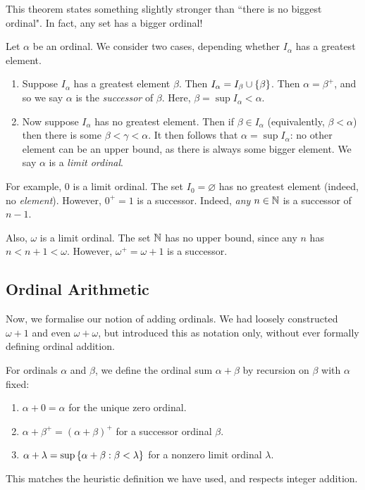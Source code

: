\documentclass{article}
\begin{document}
\begin{note}
	This theorem states something slightly stronger than ``there is no biggest ordinal". In fact, any set has a bigger ordinal!
\end{note}

\begin{definition}
    Let $\alpha$ be an ordinal. We consider two cases, depending whether $I_\alpha$ has a greatest element.
	\begin{enumerate}
	    \item Suppose $I_\alpha$ has a greatest element $\beta$. Then $I_\alpha = I_\beta \cup \left\lbrace \beta \right\rbrace$. Then $\alpha = \beta^+$, and so we say $\alpha$ is the \textit{successor} of $\beta$. Here, $\beta = \sup I_\alpha < \alpha$.
	    \item Now suppose $I_\alpha$ has no greatest element. Then if $\beta \in I_\alpha$ (equivalently, $\beta < \alpha$) then there is some $\beta < \gamma < \alpha$. It then follows that $\alpha = \sup I_\alpha$: no other element can be an upper bound, as there is always some bigger element. We say $\alpha$ is a \textit{limit ordinal}.
	\end{enumerate}
	For example, 0 is a limit ordinal. The set $I_0 = \varnothing$ has no greatest element (indeed, no \textit{element}). However, $0^+ = 1$ is a successor. Indeed, \textit{any} $n \in \mathbb{N}$ is a successor of $n-1$.
	
	Also, $\omega$ is a limit ordinal. The set $\mathbb{N}$ has no upper bound, since any $n$ has $n < n+1 < \omega$. However, $\omega^+ = \omega + 1$ is a successor.
\end{definition}


\subsection{Ordinal Arithmetic}
\label{ordinal-arithmetic}

Now, we formalise our notion of adding ordinals. We had loosely constructed $\omega + 1$ and even $\omega + \omega$, but introduced this as notation only, without ever formally defining ordinal addition.

\begin{definition}
	\label{ordinal-addition-inductive}
    For ordinals $\alpha$ and $\beta$, we define the ordinal sum $\alpha + \beta$ by recursion on $\beta$ with $\alpha$ fixed:
    \begin{enumerate}
    	\item $\alpha + 0 = \alpha$ for the unique zero ordinal.
    	\item $\alpha + \beta^+ = (\alpha + \beta)^+$ for a successor ordinal $\beta$.
    	\item $\alpha + \lambda = \sup\left\lbrace \alpha + \beta : \beta < \lambda \right\rbrace$ for a nonzero limit ordinal $\lambda$.
	\end{enumerate}
	This matches the heuristic definition we have used, and respects integer addition.
\end{definition}
\end{document}
